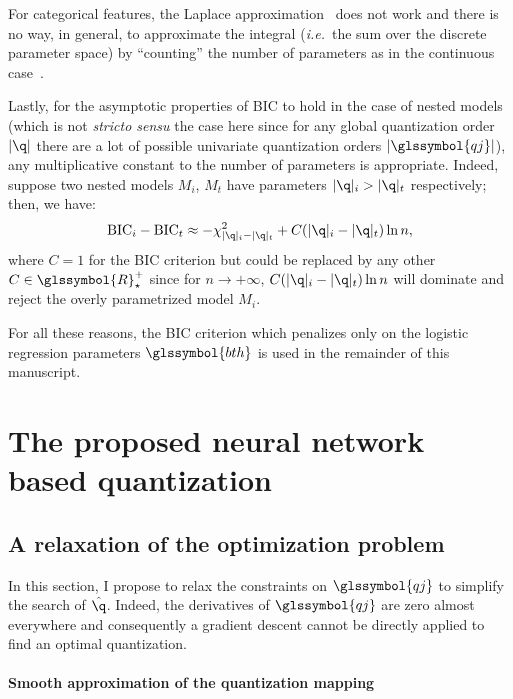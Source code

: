For categorical features, the Laplace approximation~\cite{lebarbier} does not work and there is no way, in general, to approximate the integral (\textit{i.e.}\ the sum over the discrete parameter space) by ``counting'' the number of parameters as in the continuous case~\cite{vincent_disc}.

Lastly, for the asymptotic properties of BIC to hold in the case of nested models (which is not \textit{stricto sensu} the case here since for any global quantization order $|\q|$ there are a lot of possible univariate quantization orders $|\glssymbol{qj}|$), any multiplicative constant to the number of parameters is appropriate. Indeed, suppose two nested models $M_i$, $M_t$ have parameters $|\q|_i > |\q|_t$ respectively; then, we have:
\[ \text{BIC}_i - \text{BIC}_t \approx - \chi^2_{|\q|_i - |\q|_t} + C(|\q|_i - |\q|_t)\ln n, \]
where $C=1$ for the BIC criterion but could be replaced by any other $C \in \glssymbol{R}^+_\star$ since for $n \to + \infty$, $C(|\q|_i - |\q|_t)\ln n$ will dominate and reject the overly parametrized model $M_i$.

For all these reasons, the BIC criterion which penalizes only on the logistic regression parameters $\glssymbol{bth}$ is used in the remainder of this manuscript.

\section{The proposed neural network based quantization}
\label{sec:proposal}

\subsection{A relaxation of the optimization problem} \label{subsec:relaxation}

In this section, I propose to relax the constraints on $\glssymbol{qj}$ to simplify the search of $\hat{\q}$. Indeed, the derivatives of $\glssymbol{qj}$ are zero almost everywhere and consequently a gradient descent cannot be directly applied to find an optimal quantization.

\paragraph{Smooth approximation of the quantization mapping}


